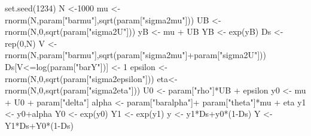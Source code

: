 \documentclass[
]{book}
\newenvironment{Shaded}{\begin{snugshade}}{\end{snugshade}}
\newcommand{\DecValTok}[1]{\textcolor[rgb]{0.00,0.00,0.81}{#1}}
\newcommand{\FunctionTok}[1]{\textcolor[rgb]{0.00,0.00,0.00}{#1}}
\newcommand{\NormalTok}[1]{#1}
\newcommand{\OtherTok}[1]{\textcolor[rgb]{0.56,0.35,0.01}{#1}}
\newcommand{\SpecialCharTok}[1]{\textcolor[rgb]{0.00,0.00,0.00}{#1}}
\newcommand{\StringTok}[1]{\textcolor[rgb]{0.31,0.60,0.02}{#1}}
\theoremstyle{definition}
\theoremstyle{definition}
\theoremstyle{definition}
\theoremstyle{definition}
\theoremstyle{remark}
\begin{document}
\begin{Shaded}
\begin{Highlighting}[]
\FunctionTok{set.seed}\NormalTok{(}\DecValTok{1234}\NormalTok{)}
\NormalTok{N }\OtherTok{\textless{}{-}}\DecValTok{1000}
\NormalTok{mu }\OtherTok{\textless{}{-}} \FunctionTok{rnorm}\NormalTok{(N,param[}\StringTok{"barmu"}\NormalTok{],}\FunctionTok{sqrt}\NormalTok{(param[}\StringTok{"sigma2mu"}\NormalTok{]))}
\NormalTok{UB }\OtherTok{\textless{}{-}} \FunctionTok{rnorm}\NormalTok{(N,}\DecValTok{0}\NormalTok{,}\FunctionTok{sqrt}\NormalTok{(param[}\StringTok{"sigma2U"}\NormalTok{]))}
\NormalTok{yB }\OtherTok{\textless{}{-}}\NormalTok{ mu }\SpecialCharTok{+}\NormalTok{ UB }
\NormalTok{YB }\OtherTok{\textless{}{-}} \FunctionTok{exp}\NormalTok{(yB)}
\NormalTok{Ds }\OtherTok{\textless{}{-}} \FunctionTok{rep}\NormalTok{(}\DecValTok{0}\NormalTok{,N)}
\NormalTok{V }\OtherTok{\textless{}{-}} \FunctionTok{rnorm}\NormalTok{(N,param[}\StringTok{"barmu"}\NormalTok{],}\FunctionTok{sqrt}\NormalTok{(param[}\StringTok{"sigma2mu"}\NormalTok{]}\SpecialCharTok{+}\NormalTok{param[}\StringTok{"sigma2U"}\NormalTok{]))}
\NormalTok{Ds[V}\SpecialCharTok{\textless{}=}\FunctionTok{log}\NormalTok{(param[}\StringTok{"barY"}\NormalTok{])] }\OtherTok{\textless{}{-}} \DecValTok{1} 
\NormalTok{epsilon }\OtherTok{\textless{}{-}} \FunctionTok{rnorm}\NormalTok{(N,}\DecValTok{0}\NormalTok{,}\FunctionTok{sqrt}\NormalTok{(param[}\StringTok{"sigma2epsilon"}\NormalTok{]))}
\NormalTok{eta}\OtherTok{\textless{}{-}} \FunctionTok{rnorm}\NormalTok{(N,}\DecValTok{0}\NormalTok{,}\FunctionTok{sqrt}\NormalTok{(param[}\StringTok{"sigma2eta"}\NormalTok{]))}
\NormalTok{U0 }\OtherTok{\textless{}{-}}\NormalTok{ param[}\StringTok{"rho"}\NormalTok{]}\SpecialCharTok{*}\NormalTok{UB }\SpecialCharTok{+}\NormalTok{ epsilon}
\NormalTok{y0 }\OtherTok{\textless{}{-}}\NormalTok{ mu }\SpecialCharTok{+}\NormalTok{  U0 }\SpecialCharTok{+}\NormalTok{ param[}\StringTok{"delta"}\NormalTok{]}
\NormalTok{alpha }\OtherTok{\textless{}{-}}\NormalTok{ param[}\StringTok{"baralpha"}\NormalTok{]}\SpecialCharTok{+}\NormalTok{  param[}\StringTok{"theta"}\NormalTok{]}\SpecialCharTok{*}\NormalTok{mu }\SpecialCharTok{+}\NormalTok{ eta}
\NormalTok{y1 }\OtherTok{\textless{}{-}}\NormalTok{ y0}\SpecialCharTok{+}\NormalTok{alpha}
\NormalTok{Y0 }\OtherTok{\textless{}{-}} \FunctionTok{exp}\NormalTok{(y0)}
\NormalTok{Y1 }\OtherTok{\textless{}{-}} \FunctionTok{exp}\NormalTok{(y1)}
\NormalTok{y }\OtherTok{\textless{}{-}}\NormalTok{ y1}\SpecialCharTok{*}\NormalTok{Ds}\SpecialCharTok{+}\NormalTok{y0}\SpecialCharTok{*}\NormalTok{(}\DecValTok{1}\SpecialCharTok{{-}}\NormalTok{Ds)}
\NormalTok{Y }\OtherTok{\textless{}{-}}\NormalTok{ Y1}\SpecialCharTok{*}\NormalTok{Ds}\SpecialCharTok{+}\NormalTok{Y0}\SpecialCharTok{*}\NormalTok{(}\DecValTok{1}\SpecialCharTok{{-}}\NormalTok{Ds)}
\end{Highlighting}
\end{Shaded}
\end{document}

